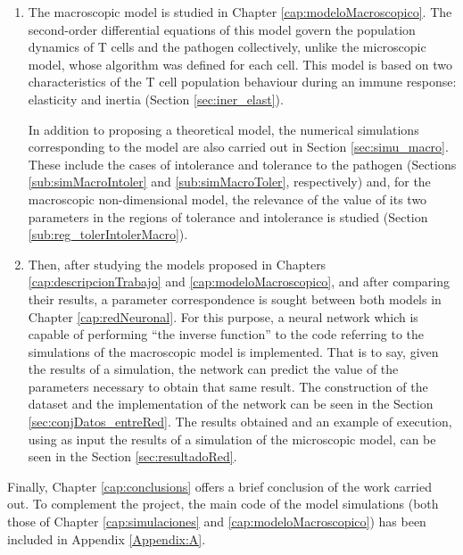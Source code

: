\begin{enumerate}
	\item The macroscopic model is studied in Chapter \ref{cap:modeloMacroscopico}. The second-order differential equations of this model govern the population dynamics of T cells and the pathogen collectively, unlike the microscopic model, whose algorithm was defined for each cell. This model is based on two characteristics of the T cell population behaviour during an immune response: elasticity and inertia (Section \ref{sec:iner_elast}). 
	
	In addition to proposing a theoretical model, the numerical simulations corresponding to the model are also carried out in Section \ref{sec:simu_macro}. These include the cases of intolerance and tolerance to the pathogen (Sections \ref{sub:simMacroIntoler} and \ref{sub:simMacroToler}, respectively) and, for the macroscopic non-dimensional model, the relevance of the value of its two parameters in the regions of tolerance and intolerance is studied (Section \ref{sub:reg_tolerIntolerMacro}).

	\item Then, after studying the models proposed in Chapters \ref{cap:descripcionTrabajo} and \ref{cap:modeloMacroscopico}, and after comparing their results, a parameter correspondence is sought between both models in Chapter \ref{cap:redNeuronal}. For this purpose, a neural network which is capable of performing ``the inverse function'' to the code referring to the simulations of the macroscopic model is implemented. That is to say, given the results of a simulation, the network can predict the value of the parameters necessary to obtain that same result. The construction of the dataset and the implementation of the network can be seen in the Section \ref{sec:conjDatos_entreRed}. The results obtained and an example of execution, using as input the results of a simulation of the microscopic model, can be seen in the Section \ref{sec:resultadoRed}.
	

\end{enumerate}

Finally, Chapter \ref{cap:conclusions} offers a brief conclusion of the work carried out. To complement the project, the main code of the model simulations (both those of Chapter \ref{cap:simulaciones} and \ref{cap:modeloMacroscopico}) has been included in Appendix \ref{Appendix:A}.

